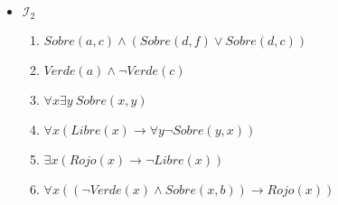 \documentclass[8pt, letterpaper]{article}
\begin{document}
\begin{enumerate}
\begin{itemize}
  \item[] $\mathcal{I}_2$
    \begin{enumerate}
    \item[] $Sobre(a, c) \land (Sobre(d, f) \lor Sobre(d, c))$
    \item[] $Verde(a) \land \neg Verde(c)$
    \item[] $\forall x \exists y\ Sobre(x,y)$
    \item[] $\forall x (Libre(x)\rightarrow \forall y \neg Sobre(y,x))$
    \item[] $\exists x(Rojo(x) \rightarrow \neg Libre(x))$
    \item[] $\forall x((\neg Verde(x) \land Sobre(x, b)) \rightarrow Rojo(x))$
    \end{enumerate}
  \end{itemize}
\end{enumerate}
\end{document}
